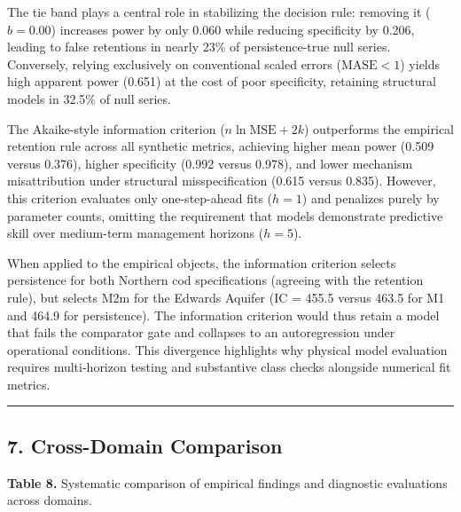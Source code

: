 \documentclass[11pt]{article}
\begin{document}
The tie band plays a central role in stabilizing the decision rule:
removing it (\(b = 0.00\)) increases power by only 0.060 while reducing
specificity by 0.206, leading to false retentions in nearly 23\% of
persistence-true null series. Conversely, relying exclusively on
conventional scaled errors (\(\text{MASE} < 1\)) yields high apparent
power (0.651) at the cost of poor specificity, retaining structural
models in 32.5\% of null series.

The Akaike-style information criterion (\(n \ln\text{MSE} + 2k\))
outperforms the empirical retention rule across all synthetic metrics,
achieving higher mean power (0.509 versus 0.376), higher specificity
(0.992 versus 0.978), and lower mechanism misattribution under
structural misspecification (0.615 versus 0.835). However, this
criterion evaluates only one-step-ahead fits (\(h = 1\)) and penalizes
purely by parameter counts, omitting the requirement that models
demonstrate predictive skill over medium-term management horizons
(\(h = 5\)).

When applied to the empirical objects, the information criterion selects
persistence for both Northern cod specifications (agreeing with the
retention rule), but selects M2m for the Edwards Aquifer (IC = 455.5
versus 463.5 for M1 and 464.9 for persistence). The information
criterion would thus retain a model that fails the comparator gate and
collapses to an autoregression under operational conditions. This
divergence highlights why physical model evaluation requires
multi-horizon testing and substantive class checks alongside numerical
fit metrics.

\begin{center}\rule{0.5\linewidth}{0.5pt}\end{center}

\subsection{7. Cross-Domain Comparison}\label{cross-domain-comparison}

\textbf{Table 8.} Systematic comparison of empirical findings and
diagnostic evaluations across domains.
\end{document}
